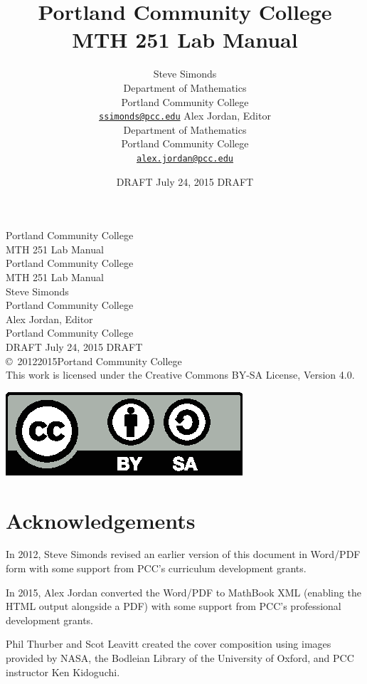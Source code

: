 \documentclass[10pt,oneside,]{book}
\title{Portland Community College\\MTH 251 Lab Manual}
\author{Steve Simonds\\
Department of Mathematics\\
Portland Community College\\
\href{mailto:ssimonds@pcc.edu}{\nolinkurl{ssimonds@pcc.edu}}
Alex Jordan, Editor\\
Department of Mathematics\\
Portland Community College\\
\href{mailto:alex.jordan@pcc.edu}{\nolinkurl{alex.jordan@pcc.edu}}
}
\date{DRAFT July 24, 2015 DRAFT}
\theoremstyle{plain}
\theoremstyle{definition}
\numberwithin{equation}{section}
\begin{document}
\frontmatter
\thispagestyle{empty}
{\centering
\vspace*{0.28\textheight}
{\Huge Portland Community College\\MTH 251 Lab Manual}\\}
\clearpage
\thispagestyle{empty}
\null%
\clearpage
\thispagestyle{empty}
{\centering
\vspace*{0.14\textheight}
{\Huge Portland Community College\\MTH 251 Lab Manual}\\[3\baselineskip]
{\Large Steve Simonds}\\[0.5\baselineskip]
{\Large Portland Community College}\\[3\baselineskip]
{\Large Alex Jordan, Editor}\\[0.5\baselineskip]
{\Large Portland Community College}\\[3\baselineskip]
{\Large DRAFT July 24, 2015 DRAFT}\\}
\clearpage
\thispagestyle{empty}
\noindent\copyright\ 2012\textendash{}2015\quad{}Portand Community College\\[0.5\baselineskip]
This work is licensed under the Creative Commons BY-SA License, Version 4.0.%

            \par
\includegraphics[]{../images/by-sa.eps}%
\par
{}
\null\clearpage
\chapter*{Acknowledgements}\label{acknowledgement-1}
In 2012, Steve Simonds revised an earlier version of this document in Word/PDF form with some support from PCC's curriculum development grants.%
\par
In 2015, Alex Jordan converted the Word/PDF to MathBook XML (enabling the HTML output alongside a PDF) with some support from PCC's professional development grants.%
\par
Phil Thurber and Scot Leavitt created the cover composition using images provided by NASA, the Bodleian Library of the University of Oxford, and PCC instructor Ken Kidoguchi.%
\end{document}
